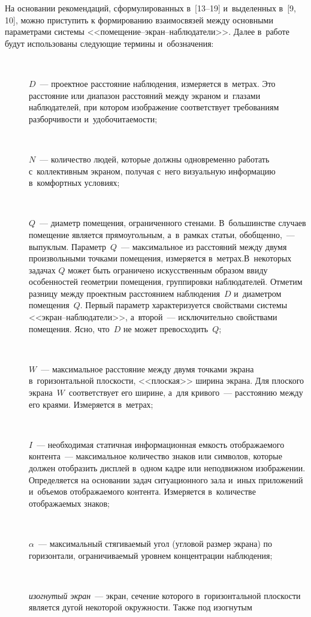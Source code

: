 \begin{multicols}{2}
	На основании рекомендаций, сформулированных в~[13--19]
и~выделенных в~[9, 10], можно при\-ступить к формированию взаимосвязей
между основны\-ми параметрами системы
<<по\-ме\-ще\-ние--экран--на\-блю\-да\-те\-ли>>. Далее в~работе будут
использованы следующие термины и~обозначения:
\begin{description}
\item[\,]
$D$~--- проектное расстояние наблюдения, измеряется в~метрах. Это
расстояние или диапазон расстояний между экраном и~глазами наблюдателей,
при котором изображение соответствует требованиям разборчивости
и~удобочита\-емости;
\item[\,]
$N$~--- количество людей, которые должны одновременно работать
с~коллективным экраном, получая с~него визуальную информацию
в~комфортных условиях;
\item[\,]
$Q$~--- диаметр помещения, ограниченного сте\-нами. В~большинстве случаев
помещение является прямоугольным, а~в~рамках статьи, обобщенно,~---
выпуклым. Параметр~$Q$~--- максимальное из расстояний между двумя произвольными
точками помещения, измеряется в~метрах.\linebreak В~некоторых задачах $Q$ может
быть ограничено искусственным образом ввиду особенностей геометрии
помещения, группировки наблюдателей. Отметим разницу между проектным
расстояни\-ем наблюдения~$D$ и~диаметром помещения~$Q$. Первый
параметр характеризуется свойствами системы <<экран--на\-блю\-да\-те\-ли>>,
а~второй~--- исключительно свойствами помещения. Ясно, что~$D$ не
может превосходить~$Q$;
\item[\,]
$W$~--- максимальное расстояние между двумя точками экрана
в~горизонтальной плоскости, <<плоская>> ширина экрана. Для плоского
экрана~$W$~соответствует его ширине, а~для кривого~--- расстоянию между
его краями. Измеряется в~мет\-рах;
\item[\,]
$I$~--- необходимая статичная информационная емкость отображаемого
контента~--- максимальное количество знаков или символов, которые должен
отобразить дисплей в~одном кадре или неподвижном изображении.
Определяется на основании задач ситуационного зала и~иных приложений
и~объемов отображаемого контента. Измеряется в~количестве отображаемых
знаков;
\item[\,]
$\alpha$~--- максимальный стягиваемый угол (угловой размер экрана) по
горизонтали, ограничиваемый уровнем концентрации наблюдения;
\item[\,]
\textit{изогнутый экран}~--- экран, сечение которого в~горизонтальной
плоскости является дугой некоторой окружности. Также под изогнутым

\end{description}
\end{multicols}
